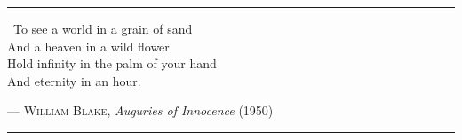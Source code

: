 
\vspace*{3pc}
\begin{center}
\begin{minipage}{0.7\linewidth}
\hrule
\vspace{8pt}
{\huge\guillemotleft} ~To see a world in a grain of sand\\
And a heaven in a wild flower\\
Hold infinity in the palm of your hand\\
And eternity in an hour. {\huge\guillemotright} \\
\vspace{2pt}
\begin{flushright}
--- \textsc{William Blake}, \textit{Auguries of Innocence} (1950)
\end{flushright}
\vspace{8pt}
\hrule
\end{minipage}
\end{center}
\vspace{3pc}



